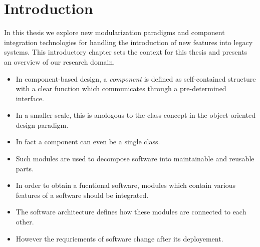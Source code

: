 \chapter{Introduction}

In this thesis we explore new modularization paradigms and component integration technologies for handling the introduction of new features into legacy systems.
This introductory chapter sets the context for this thesis and presents an overview of our research domain.

\begin{itemize}
 \item In component-based design, a \emph{component} is defined as self-contained structure with a clear function which communicates through a pre-determined interface. 
 \item In a smaller scale, this is anologous to the class concept in the object-oriented design paradigm. 
 \item In fact a component can even be a single class.
\item Such modules are used to decompose software into maintainable and reusable parts.
\item In order to obtain a fucntional software, modules which contain various features of a software should be integrated.
\item The software architecture defines how these modules are connected to each other.
\item However the requriements of software change after its deployement.
\end{itemize}







